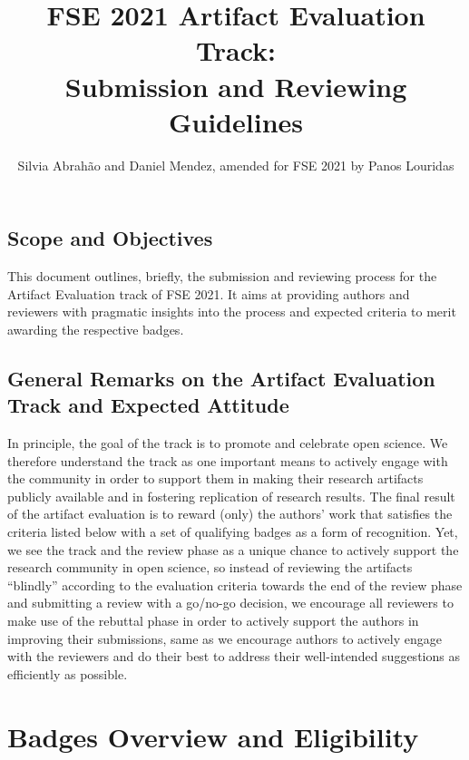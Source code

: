 \documentclass[twoside,a4paper]{refart}
\title{FSE 2021 Artifact Evaluation Track:\\
  Submission and Reviewing Guidelines}
\author{Silvia Abrahão and Daniel Mendez, amended for FSE 2021 by
  Panos Louridas}
\begin{document}
\maketitle

\subsection*{Scope and Objectives}

This document outlines, briefly, the submission and reviewing process
for the Artifact Evaluation track of FSE 2021. It aims at
providing authors and reviewers with pragmatic insights into the
process and expected criteria to merit awarding the respective badges.

\subsection*{General Remarks on the Artifact Evaluation Track and
  Expected Attitude}

In principle, the goal of the track is to promote and celebrate open
science. We therefore understand the track as one important means to
actively engage with the community in order to support them in making
their research artifacts publicly available and in fostering
replication of research results. The final result of the artifact
evaluation is to reward (only) the authors' work that satisfies the
criteria listed below with a set of qualifying badges as a form of
recognition. Yet, we see the track and the review phase as a unique
chance to actively support the research community in open science, so
instead of reviewing the artifacts ``blindly'' according to the
evaluation criteria towards the end of the review phase and submitting
a review with a go/no-go decision, we encourage all reviewers to make
use of the rebuttal phase in order to actively support the authors in
improving their submissions, same as we encourage authors to actively
engage with the reviewers and do their best to address their
well-intended suggestions as efficiently as possible.


\newpage

\tableofcontents

\newpage

\section{Badges Overview and Eligibility}
\end{document}
